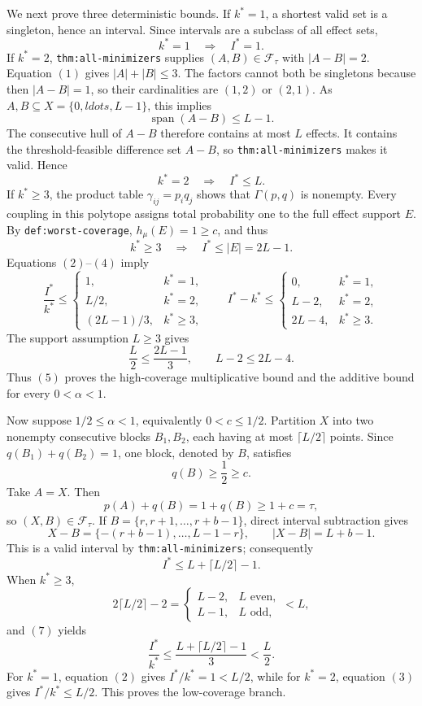 We next prove three deterministic bounds.  If \(k^*=1\), a shortest valid set is a singleton, hence an interval.  Since intervals are a subclass of all effect sets,
\[
k^*=1\quad\Longrightarrow\quad I^*=1.
\tag{2}
\]
If \(k^*=2\), \texttt{thm:all-minimizers} supplies \((A,B)\in\mathcal F_{\tau}\) with \(|A-B|=2\).  Equation \((1)\) gives \(|A|+|B|\leq3\).  The factors cannot both be singletons because then \(|A-B|=1\), so their cardinalities are \((1,2)\) or \((2,1)\).  As \(A,B\subseteq X=\{0,ldots,L-1\}\), this implies
\[
\operatorname{span}(A-B)\leq L-1.
\]
The consecutive hull of \(A-B\) therefore contains at most \(L\) effects.  It contains the threshold-feasible difference set \(A-B\), so \texttt{thm:all-minimizers} makes it valid.  Hence
\[
k^*=2\quad\Longrightarrow\quad I^*\leq L.
\tag{3}
\]
If \(k^*\geq3\), the product table \(\gamma_{ij}=p_iq_j\) shows that \(\Gamma(p,q)\) is nonempty.  Every coupling in this polytope assigns total probability one to the full effect support \(E\).  By \texttt{def:worst-coverage}, \(h_{\mu}(E)=1\geq c\), and thus
\[
k^*\geq3\quad\Longrightarrow\quad I^*\leq |E|=2L-1.
\tag{4}
\]
Equations \((2)\)--\((4)\) imply
\[
\frac{I^*}{k^*}\leq
\begin{cases}
1,&k^*=1,\\
L/2,&k^*=2,\\
(2L-1)/3,&k^*\geq3,
\end{cases}
\qquad
I^*-k^*\leq
\begin{cases}
0,&k^*=1,\\
L-2,&k^*=2,\\
2L-4,&k^*\geq3.
\end{cases}
\tag{5}
\]
The support assumption \(L\geq3\) gives
\[
\frac L2\leq\frac{2L-1}{3},
\qquad
L-2\leq2L-4.
\]
Thus \((5)\) proves the high-coverage multiplicative bound and the additive bound for every \(0<\alpha<1\).

Now suppose \(1/2\leq\alpha<1\), equivalently \(0<c\leq1/2\).  Partition \(X\) into two nonempty consecutive blocks \(B_1,B_2\), each having at most \(\lceil L/2\rceil\) points.  Since \(q(B_1)+q(B_2)=1\), one block, denoted by \(B\), satisfies
\[
q(B)\geq\frac12\geq c.
\tag{6}
\]
Take \(A=X\).  Then
\[
p(A)+q(B)=1+q(B)\geq1+c=\tau,
\]
so \((X,B)\in\mathcal F_{\tau}\).  If \(B=\{r,r+1,\ldots,r+b-1\}\), direct interval subtraction gives
\[
X-B=\{-(r+b-1),\ldots,L-1-r\},
\qquad
|X-B|=L+b-1.
\]
This is a valid interval by \texttt{thm:all-minimizers}; consequently
\[
I^*\leq L+\lceil L/2\rceil-1.
\tag{7}
\]
When \(k^*\geq3\),
\[
2\lceil L/2\rceil-2
=\begin{cases}
L-2,&L\text{ even},\\
L-1,&L\text{ odd},
\end{cases}
<L,
\]
and \((7)\) yields
\[
\frac{I^*}{k^*}
\leq\frac{L+\lceil L/2\rceil-1}{3}
<\frac L2.
\tag{8}
\]
For \(k^*=1\), equation \((2)\) gives \(I^*/k^*=1<L/2\), while for \(k^*=2\), equation \((3)\) gives \(I^*/k^*\leq L/2\).  This proves the low-coverage branch.

